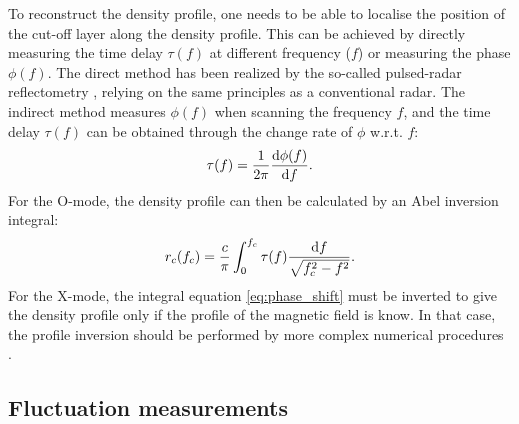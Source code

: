 To reconstruct the density profile, one needs to be able to localise the position of the cut-off layer along the density profile. This can be achieved by directly measuring the time delay $\tau(f)$ at different frequency ($f$) or measuring the phase $\phi(f)$. The direct method has been realized by the so-called pulsed-radar reflectometry \cite{Donne_1997_FED}, relying on the same principles as a conventional radar. The indirect method measures $\phi(f)$ when scanning the frequency $f$, and the time delay $\tau(f)$ can be obtained through the change rate of $\phi$ w.r.t. $f$:%
\begin{equation}\label{eq:tof}
  \tau(f)=\frac{1}{2\pi}\frac{\mathrm{d} \phi(f)}{\mathrm{d} f}.
\end{equation}
\noindent For the O-mode, the density profile can then be calculated by an Abel inversion integral:%
\begin{equation}\label{eq:rc}
  r_c(f_c)=\frac{c}{\pi}\int_0^{f_c}\tau(f)\frac{\mathrm{d} f}{\sqrt{f_c^2-f^2}}.
\end{equation}
\noindent For the X-mode, the integral equation \eqref{eq:phase_shift} must be inverted to give the density profile only if the profile of the magnetic field is know. In that case, the profile inversion should be performed by more complex numerical procedures \cite{Bottolier_1987_RSI, Morales_2018_Thesis}.


\subsection{Fluctuation measurements}


